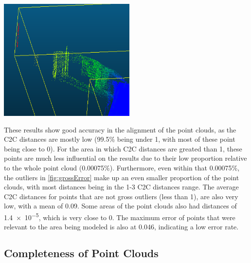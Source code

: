 \documentclass[man]{apa7}
\begin{document}
\begin{minipage}{\linewidth}
  \includegraphics[height=\textheight/4 ,width=\textwidth/2]{figures/grossError.png}
  \label{fig:grossError}
\end{minipage}

These results show good accuracy in the alignment of the point clouds, as the C2C distances are mostly low (99.5\% being under 1, with most of these point being close to 0). For the area in which C2C distances are greated than 1, these points are much less influential on the results due to their low proportion relative to the whole point cloud (0.00075\%). Furthermore, even within that 0.00075\%, the outliers in \ref{fig:grossError} make up an even smaller proportion of the point clouds, with most distances being in the 1-3 C2C distances range. The average C2C distances for points that are not gross outliers (less than 1), are also very low, with a mean of 0.09. Some areas of the point clouds also had distances of \num{1.4e-5}, which is very close to 0. The maximum error of points that were relevant to the area being modeled is also at 0.046, indicating a low error rate.

\subsection{Completeness of Point Clouds}
\end{document}
